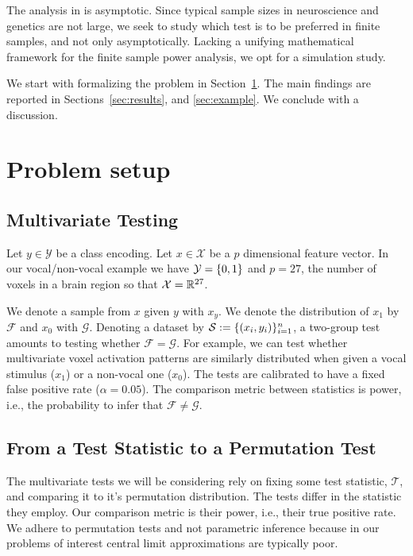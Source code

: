 \documentclass[]{bio}
\begin{document}
The analysis in \cite{ramdas_classification_2016} is asymptotic. 
Since typical sample sizes in neuroscience and genetics are not large, we seek to study which test is to be preferred in finite samples, and not only asymptotically.
Lacking a unifying mathematical framework for the finite sample power analysis, we opt for a simulation study. 

We start with formalizing the problem in Section~\ref{sec:problem_setup}.
The main findings are reported in Sections~\ref{sec:results}, and \ref{sec:example}.
We conclude with a discussion.







\section{Problem setup}
\label{sec:problem_setup}


\subsection{Multivariate Testing}

Let $y \in \mathcal{Y}$ be a class encoding. 
Let $x \in \mathcal{X}$ be a $p$ dimensional feature vector. 
In our vocal/non-vocal example we have $\mathcal{Y}=\{ 0,1 \}$ and $p=27$, the number of voxels in a brain region so that $\mathcal{X}=\mathbb{R}^{27}$. 

We denote a sample from $x$ given $y$ with $x_y$.
We denote the distribution of $x_1$ by $\mathcal{F}$ and $x_0$ with $\mathcal{G}$.
Denoting a dataset by $\mathcal{S}:=\{(x_i,y_i)\}_{i=1}^n$, a two-group test amounts to testing whether $\mathcal{F}=\mathcal{G}$.
For example, we can test whether multivariate voxel activation patterns are similarly distributed when given a vocal stimulus ($x_1$) or a non-vocal one ($x_0$).
The tests are calibrated to have a fixed false positive rate ($\alpha=0.05$).
The comparison metric between statistics is power, i.e., the probability to infer that $\mathcal{F}\neq\mathcal{G}$.


\subsection{From a Test Statistic to a Permutation Test}

The multivariate tests we will be considering rely on fixing some test statistic, $\mathcal{T}$, and comparing it to it's permutation distribution. 
The tests differ in the statistic they employ.
Our comparison metric is their power, i.e., their true positive rate. 
We adhere to permutation tests and not parametric inference because in our problems of interest central limit approximations are typically poor.
\end{document}
